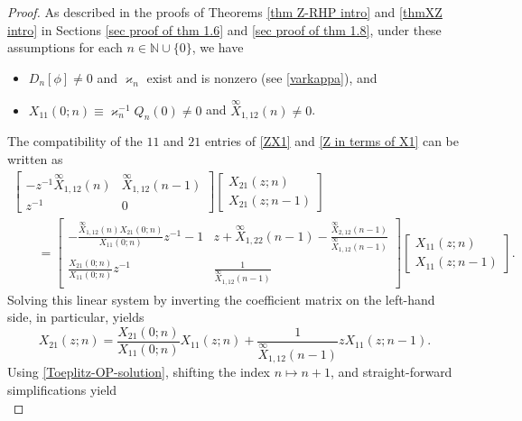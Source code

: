 \documentclass[pdftex]{sigma}
\numberwithin{equation}{section}
\newcommand{\N}{{\mathbb N}}
\newcommand{\di}{\displaystyle}
\begin{document}
		\begin{proof}
			As described in the proofs of Theorems \ref{thm Z-RHP intro} and \ref{thmXZ intro} in Sections \ref{sec proof of thm 1.6} and \ref{sec proof of thm 1.8}, under these assumptions for each $n \in \N \cup \{0\}$, we have
			\begin{itemize}\itemsep=0pt
				\item $D_n[\phi] \neq 0$ and $\varkappa_{n}$ exist and is nonzero (see \eqref{varkappa}), and
				\item$X_{11}(0;n) \equiv \varkappa^{-1}_n Q_n(0) \neq 0$ and $ \overset{\infty}{X}_{1,12}(n)\neq 0$.
			\end{itemize}
			The compatibility of the $11$ and $21$ entries of \eqref{ZX1} and \eqref{Z in terms of X1} can be written as
			\begin{gather}
						\begin{bmatrix}
						- z^{-1} \overset{\infty}{X}_{1,12}(n) & \overset{\infty}{X}_{1,12}(n-1) \\
						z^{-1} & 0
					\end{bmatrix} \begin{bmatrix}
						X_{21}(z;n) \\ X_{21}(z;n-1)
					\end{bmatrix}\nonumber \\
\qquad= 	\begin{bmatrix}
						- \di \tfrac{\overset{\infty}{X}_{1,12}(n)X_{21}(0;n)}{X_{11}(0;n)}z^{-1} - 1 & z + \overset{\infty}{X}_{1,22}(n-1) - \di \tfrac{\overset{\infty}{X}_{2,12}(n-1)}{\overset{\infty}{X}_{1,12}(n-1)} \\
						\di	\tfrac{X_{21}(0;n)}{X_{11}(0;n)} z^{-1} & \di
						\tfrac{1}{\overset{\infty}{X}_{1,12}(n-1)}
					\end{bmatrix} \begin{bmatrix}
						X_{11}(z;n) \\ X_{11}(z;n-1)
					\end{bmatrix}.\label{Z compatibility}
			\end{gather}
			Solving this linear system by inverting the coefficient matrix on the left-hand side, in particular, yields
			\begin{equation*}
				X_{21}(z;n) = \frac{X_{21}(0;n)}{X_{11}(0;n)} X_{11}(z;n) + 		\frac{1}{\overset{\infty}{X}_{1,12}(n-1)} z X_{11}(z;n-1).
			\end{equation*}
			Using \eqref{Toeplitz-OP-solution}, shifting the index $n \mapsto n+1$, and straight-forward simplifications yield
			\begin{equation}\label{zQ}

\end{equation}
\end{proof}
\end{document}
